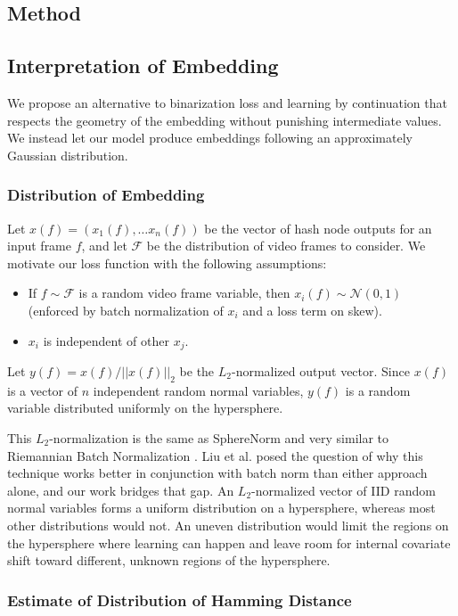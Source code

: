 \documentclass{article}
\begin{document}
\begin{multicols}{2}
\section{Method}


\subsection{Interpretation of Embedding}

We propose an alternative to binarization loss and learning by continuation that respects the geometry of the embedding without punishing intermediate values.
We instead let our model produce embeddings following an approximately Gaussian distribution.


\subsubsection{Distribution of Embedding}

Let $x(f) = (x_1(f), \ldots x_n(f))$ be the vector of hash node outputs for an input frame $f$, and let $\mathcal{F}$ be the distribution of video frames to consider.
We motivate our loss function with the following assumptions:
\begin{itemize}
\item If $f \sim \mathcal{F}$ is a random video frame variable, then $x_i(f) \sim \mathcal{N}(0,1)$ (enforced by batch normalization of $x_i$ and a loss term on skew).
\item $x_i$ is independent of other $x_j$.
\end{itemize}
Let $y(f) = x(f) / ||x(f)||_2$ be the $L_2$-normalized output vector.
Since $x(f)$ is a vector of $n$ independent random normal variables, $y(f)$ is a random variable distributed uniformly on the hypersphere.

This $L_2$-normalization is the same as SphereNorm \cite{sphere17} and very similar to Riemannian Batch Normalization \cite{riemannian17}.
Liu et al. posed the question of why this technique works better in conjunction with batch norm than either approach alone, and our work bridges that gap.
An $L_2$-normalized vector of IID random normal variables forms a uniform distribution on a hypersphere, whereas most other distributions would not.
An uneven distribution would limit the regions on the hypersphere where learning can happen and leave room for internal covariate shift toward different, unknown regions of the hypersphere.


\subsubsection{Estimate of Distribution of Hamming Distance}


\end{multicols}
\end{document}
